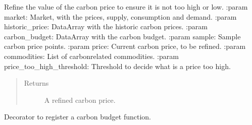 \documentclass[letterpaper,10pt,english]{sphinxmanual}
\begin{document}

\begin{fulllineitems}
\label{\detokenize{api:muse.carbon_budget.refine_new_price}}
Refine the value of the carbon price to ensure it is not too high or low.
:param market: Market, with the prices, supply, consumption and demand.
:param historic\_price: DataArray with the historic carbon prices.
:param carbon\_budget: DataArray with the carbon budget.
:param sample: Sample carbon price points.
:param price: Current carbon price, to be refined.
:param commodities: List of carbon\sphinxhyphen{}related commodities.
:param price\_too\_high\_threshold: Threshold to decide what is a price too high.
\begin{quote}\begin{description}
\item[{Returns}] \leavevmode
A refined carbon price.

\end{description}\end{quote}

\end{fulllineitems}


\begin{fulllineitems}
\label{\detokenize{api:muse.carbon_budget.register_carbon_budget_fitter}}
Decorator to register a carbon budget function.

\end{fulllineitems}
\end{document}
